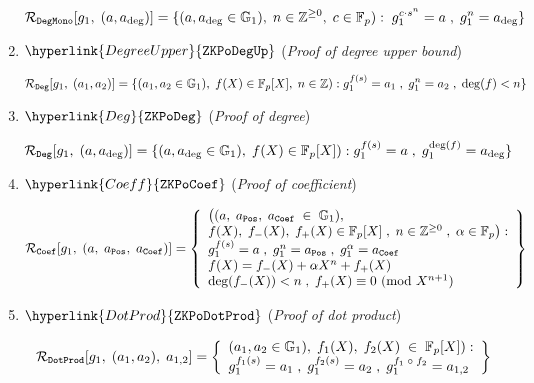 \documentclass[11pt, lettersize, notitlepage, leqno, footskip=0.6cm]{article}
\newcommand{\bz}{\mathbb Z}
\newcommand{\bFp}{\mathbb{F}_p}
\newcommand{\mc}{\mathcal}
\newcommand{\mb}{\mathbb}
\newcommand{\al}{\alpha}
\newcommand{\vs}{\vspace{-0.15cm}}
\newcommand{\Mod}[1]{\ (\mathrm{mod}\ #1)}
\numberwithin{equation}{section}
\begin{document}
\begin{enumerate}[wide, labelwidth=!, labelindent=0pt, itemsep=-0.2ex]
\vs $$\mc{R}_{\tt{DegMono}}[g_1,\;(a, a_{\deg})] = \{
(a,a_{\deg} \in \mb{G}_1),\; n\in \bz^{\geq 0},\;c\in \bFp):\; g_1^{c\cdot s^n} = a\;,\; g_1^{n} = a_{\deg} \}  $$


\item $\hyperlink{DegreeUpper}{\tt{ZKPoDegUp}}$ (\textit{Proof of degree upper bound}) \vspace{-3mm}

$$\mc{R}_{\tt{Deg}}[g_1,\;(a_1,a_2)] = \{(a_1,a_2\in\mb{G}_1),\; f(X)\in \bFp[X],\; n\in \bz): g_1^{f(s)} = a_1\;,\; g_1^{n} = a_2\;,\;\deg(f)< n\} \vs $$




\item $\hyperlink{Deg}{\tt{ZKPoDeg}}$ (\textit{Proof of degree}) \vspace{-3mm}

$$\mc{R}_{\tt{Deg}}[g_1,\;(a,a_{\deg})] = \{(a,a_{\deg}\in\mb{G}_1),\; f(X)\in \bFp[X]): g_1^{f(s)} = a\;,\; g_1^{\deg(f)} = a_{\deg}\} \vs $$

\item $\hyperlink{Coeff}{\tt{ZKPoCoef}}$ (\textit{Proof of coefficient}) \vspace{-3mm}

$$\mc{R}_{\tt{Coef}}[g_1,\;(a,\;a_{\tt{Pos}},\;a_{\tt{Coef}})] = \left\{\begin{array}{l} 
\big((a,\;a_{\tt{Pos}},\;a_{\tt{Coef}}\;\in\;\mb{G}_1),\\ f(X),\; f_{-}(X),\; f_{+}(X)\in \bFp[X]\;,\;n\in \bz^{\geq 0}\;,\;\al \in \bFp \big):\\ g_1^{f(s)} = a\;,\; g_1^{n} = a_{\tt{Pos}}\;,\; g_1^{\al} = a_{\tt{Coef}}  
\\ f(X) = f_{-}(X) + \al X^n + f_{+}(X)\\
\deg(f_{-}(X)) < n\;,\; f_{+}(X)\equiv 0 \Mod{X^{n+1}} \end{array}\right\} \vs $$ 



\item $\hyperlink{DotProd}{\tt{ZKPoDotProd}}$ (\textit{Proof of dot product}) \vspace{-3mm}

$$\mc{R}_{\tt{DotProd}}[g_1,\;(a_1,a_2),\;a_{1,2}] = \left\{\begin{array}{l} (a_1,a_2\in\mb{G}_1),\; f_1(X),\; f_2(X)\;\in\; \bFp[X]):\\ g_1^{f_1(s)} = a_1\;,\; g_1^{f_2(s)} = a_2\;,\; g_1^{f_1\;\circ\;f_2} = a_{1,2}\end{array} \right\} \vs $$


\end{enumerate}
\end{document}
